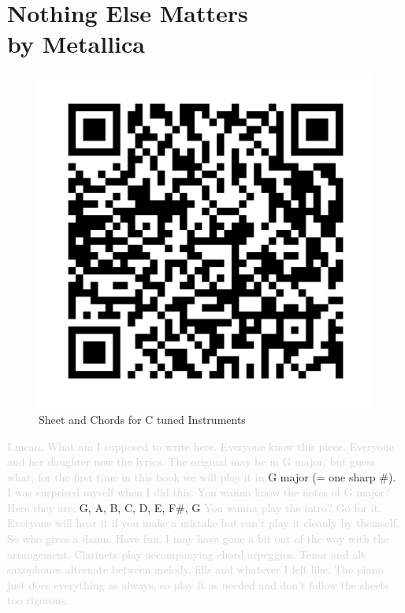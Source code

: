 \chapter[Nothing Else Matters]{Nothing Else Matters\\[1ex]\large{by Metallica}}
\begin{figure}
\includegraphics[width=1\linewidth]{QR_Codes/QR_NothingElseMatters_C.png}\\
Sheet and Chords for C tuned Instruments
\end{figure}

\textcolor{lightgray}{I mean. What am I supposed to write here. Everyone know this piece. Everyone and her daughter now the lyrics. The original may be in G major, but guess what, for the first time in this book we will play it in} G major (= one sharp $\#$).\\
\textcolor{lightgray}{I was surprised myself when I did this. You wanna know the notes of G major? Here they are:} G, A, B, C, D, E, F$\#$, G \textcolor{lightgray}{You wanna play the intro? Go for it. Everyone will hear it if you make a mistake but can't play it cleanly by themself. So who gives a damn. Have fun. I may have gone a bit out of the way with the arrangement. Clarinets play accompanying chord arpeggios. Tenor and alt saxophones alternate between melody, fills and whatever I felt like. The piano just does everything as always, so play it as needed and don't follow the sheets too rigorous.}

